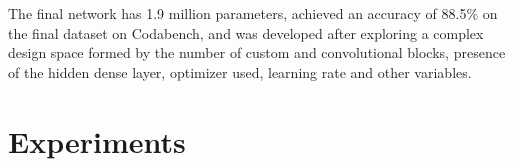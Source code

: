 \documentclass[11pt]{article}
\begin{document}
\begin{multicols}{2}
      The final network has 1.9 million parameters, achieved an accuracy of 88.5\% on the final dataset on Codabench, and was developed after exploring a complex design space formed by the number of custom and convolutional blocks, presence of the hidden dense layer, optimizer used, learning rate and other variables.

      \label{sec:experiments}
      \section{Experiments}



\end{multicols}
\end{document}
